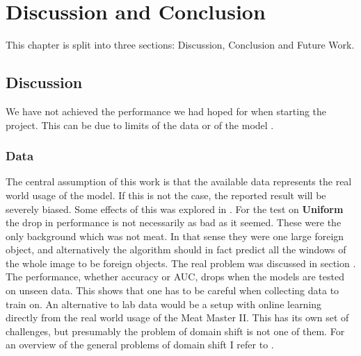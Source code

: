 \chapter{Discussion and Conclusion}
\label{chap:conclusion}
This chapter is split into three sections: Discussion, Conclusion and Future Work.
\section{Discussion}
We have not achieved the performance we had hoped for when starting the project. This can be due to limits of the data  or of the model .
\subsection{Data}
\label{sec:disdata}
The central assumption of this work is that the available data represents the real world usage of the model.
If this is not the case, the reported result will be severely biased.
Some effects of this was explored in .
For the test on \textbf{Uniform} the drop in performance is not necessarily as bad as it seemed.
These were the only background which was not meat. 
In that sense they were one large foreign object, and alternatively the algorithm should in fact predict all the windows of the whole image to be foreign objects.
The real problem was discussed in section . The performance, whether accuracy or \ac{AUC}, drops when the models are tested on unseen data.
This shows that one has to be careful when collecting data to train on.
An alternative to lab data would be a setup with online learning directly from the real world usage of the Meat Master II.
This has its own set of challenges, but presumably the problem of domain shift is not one of them.
For an overview of the general problems of domain shift I refer to \cite{damourUnderspecificationPresentsChallenges2020}. 

